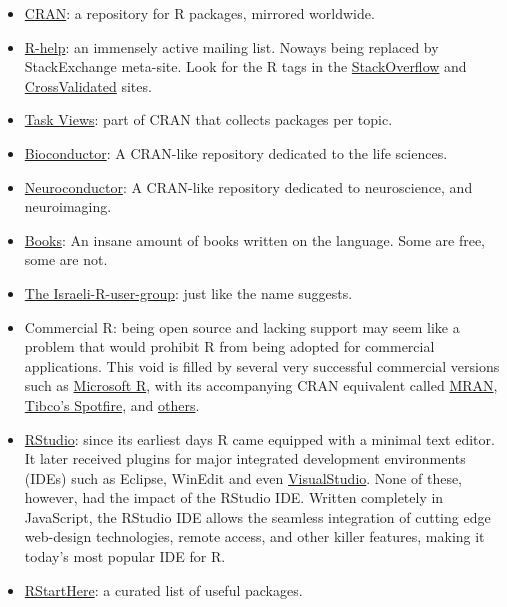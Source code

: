 \documentclass[]{book}
\theoremstyle{definition}
\theoremstyle{definition}
\theoremstyle{definition}
\theoremstyle{remark}
\begin{document}
\begin{itemize}
\item
  \href{https://cran.r-project.org/}{CRAN}: a repository for R packages,
  mirrored worldwide.
\item
  \href{https://www.r-project.org/mail.html}{R-help}: an immensely
  active mailing list. Noways being replaced by StackExchange meta-site.
  Look for the R tags in the
  \href{http://stackoverflow.com/}{StackOverflow} and
  \href{http://stats.stackexchange.com/}{CrossValidated} sites.
\item
  \href{https://cran.r-project.org/web/views/}{Task Views}: part of CRAN
  that collects packages per topic.
\item
  \href{https://www.bioconductor.org/}{Bioconductor}: A CRAN-like
  repository dedicated to the life sciences.
\item
  \href{https://www.neuroconductor.org/}{Neuroconductor}: A CRAN-like
  repository dedicated to neuroscience, and neuroimaging.
\item
  \href{https://www.r-project.org/doc/bib/R-books.html}{Books}: An
  insane amount of books written on the language. Some are free, some
  are not.
\item
  \href{https://groups.google.com/forum/\#!forum/israel-r-user-group}{The
  Israeli-R-user-group}: just like the name suggests.
\item
  Commercial R: being open source and lacking support may seem like a
  problem that would prohibit R from being adopted for commercial
  applications. This void is filled by several very successful
  commercial versions such as
  \href{https://mran.microsoft.com/open/}{Microsoft R}, with its
  accompanying CRAN equivalent called
  \href{https://mran.microsoft.com/}{MRAN},
  \href{http://spotfire.tibco.com/discover-spotfire/what-does-spotfire-do/predictive-analytics/tibco-enterprise-runtime-for-r-terr}{Tibco's
  Spotfire}, and
  \href{https://en.wikipedia.org/wiki/R_(programming_language)\#Commercial_support_for_R}{others}.
\item
  \href{https://www.rstudio.com/products/rstudio/download-server/}{RStudio}:
  since its earliest days R came equipped with a minimal text editor. It
  later received plugins for major integrated development environments
  (IDEs) such as Eclipse, WinEdit and even
  \href{https://www.visualstudio.com/vs/rtvs/}{VisualStudio}. None of
  these, however, had the impact of the RStudio IDE. Written completely
  in JavaScript, the RStudio IDE allows the seamless integration of
  cutting edge web-design technologies, remote access, and other killer
  features, making it today's most popular IDE for R.
\item
  \href{https://github.com/rstudio/RStartHere/blob/master/README.md\#import}{RStartHere}:
  a curated list of useful packages.
\end{itemize}
\end{document}

